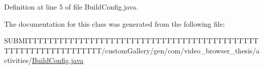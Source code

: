 Definition at line 5 of file Build\-Config.\-java.



The documentation for this class was generated from the following file\-:\begin{DoxyCompactItemize}
\item 
S\-U\-B\-M\-I\-T\-T\-T\-T\-T\-T\-T\-T\-T\-T\-T\-T\-T\-T\-T\-T\-T\-T\-T\-T\-T\-T\-T\-T\-T\-T\-T\-T\-T\-T\-T\-T\-T\-T\-T\-T\-T\-T\-T\-T\-T\-T\-T\-T\-T\-T\-T\-T\-T\-T\-T\-T\-T\-T\-T\-T\-T\-T\-T\-T\-T\-T\-T\-T/custom\-Gallery/gen/com/video\-\_\-browser\-\_\-thesis/activities/\hyperlink{_build_config_8java}{Build\-Config.\-java}\end{DoxyCompactItemize}

